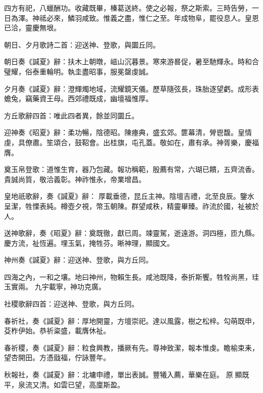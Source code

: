 \begin{pinyinscope}
 四方有祀，八蠟酬功。收藏既畢，榛葛送終。使之必報，祭之斯索。三時告勞，一日為澤。神祗必來，鱗羽咸致。惟義之盡，惟仁之至。年成物阜，罷役息人。皇恩已洽，靈慶無垠。



 朝日、夕月歌詩二首：迎送神、登歌，與圜丘同。



 朝日奏《諴夏》辭：扶木上朝暾，嵫山沉暮景。寒來游晷促，暑至馳輝永。時和合璧耀，俗泰重輪明。執圭盡昭事，服冕罄虔誠。



 夕月奏《諴夏》辭：澄輝燭地域，流耀鏡天儀。歷草隨弦長，珠胎逐望虧。成形表蟾兔，竊藥資王母。西郊禮既成，幽壇福惟厚。



 方丘歌辭四首：唯此四者異，餘並同圜丘。



 迎神奏《昭夏》辭：柔功暢，陰德昭。陳瘞典，盛玄郊。篚幕清，膋鬯馥。皇情虔，具僚肅。笙頌合，鼓鞀會。出桂旗，屯孔蓋。敬如在，肅有承。神胥樂，慶福膺。



 奠玉帛登歌：道惟生育，器乃包藏。報功稱範，殷薦有常，六瑚已饋，五齊流香。貴誠尚質，敬洽義彰。神祚惟永，帝業增昌。



 皇地祇歌辭，奏《諴夏》辭：
 厚載垂德，昆丘主神。陰壇吉禮，北至良辰。鑒水呈潔，牲慄表純。樽壺夕視，幣玉朝陳。群望咸秩，精靈畢臻。祚流於國，祉被於人。



 送神歌辭，奏《昭夏》辭：奠既徹，獻已周。竦靈駕，逝遠游。洞四極，匝九縣。慶方流，祉恆遍。埋玉氣，掩牲芬。晰神理，顯國文。



 神州奏《諴夏》辭：迎送神、登歌，與方丘同。



 四海之內，一和之壤。地曰神州，物賴生長。咸池既降，泰折斯饗。牲牷尚黑，珪玉實兩。
 九宇載寧，神功克廣。



 社稷歌辭四首：迎送神、登歌，與方丘同。



 春祈社，奏《諴夏》辭：厚地開靈，方壇崇祀。達以風露，樹之松梓。勾萌既申，芟柞伊始。恭祈粢盛，載膺休祉。



 春祈稷，奏《諴夏》辭：粒食興教，播厥有先。尊神致潔，報本惟虔。瞻榆束耒，望杏開田。方憑戩福，佇詠豐年。



 秋報社，奏《諴夏》辭：北墉申禮，單出表誠。豐犧入薦，華樂在庭。
 原顯既平，泉流又清。如雲已望，高廩斯盈。




\end{pinyinscope}
